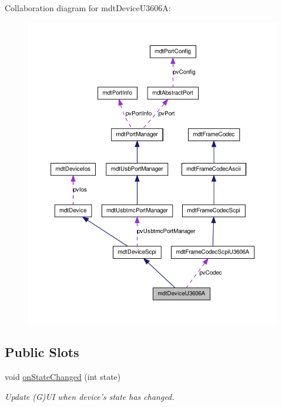Collaboration diagram for mdtDeviceU3606A:\nopagebreak
\begin{figure}[H]
\begin{center}
\leavevmode
\includegraphics[width=400pt]{classmdt_device_u3606_a__coll__graph}
\end{center}
\end{figure}
\subsection*{Public Slots}
\begin{DoxyCompactItemize}
\item 
\hypertarget{classmdt_device_u3606_a_a94a6f8b3f64cd35b33204c66816f3f6a}{
void \hyperlink{classmdt_device_u3606_a_a94a6f8b3f64cd35b33204c66816f3f6a}{onStateChanged} (int state)}
\label{classmdt_device_u3606_a_a94a6f8b3f64cd35b33204c66816f3f6a}

\begin{DoxyCompactList}\small\item\em Update (G)UI when device's state has changed. \end{DoxyCompactList}\end{DoxyCompactItemize}
